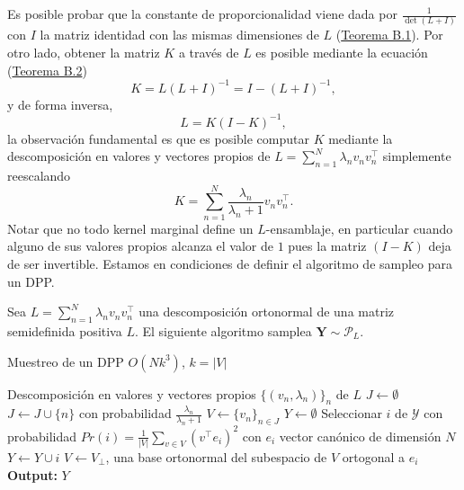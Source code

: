 \vspace{0.2cm}

Es posible probar que la constante de proporcionalidad viene dada por $\frac{1}{\det(L + I)}$ con $I$ la matriz identidad con las mismas dimensiones de $L$ (\hyperlink{Teorema B.1}{Teorema B.1}). Por otro lado, obtener la matriz $K$ a través de $L$ es posible mediante la ecuación (\hyperlink{Teorema B.2}{Teorema B.2})
\[
K = L(L+I)^{-1} = I - (L+I)^{-1} , 
\]
y de forma inversa, 
\[
L = K(I-K)^{-1} , 
\]
la observación fundamental es que es posible computar $K$ mediante la descomposición en valores y vectores propios de $L = \sum_{n=1}^{N} \lambda_nv_n v^{\top}_n$ simplemente reescalando 
\[
K = \sum_{n=1}^{N}\frac{\lambda_n}{\lambda_n + 1}v_n v^{\top}_n .
\]
Notar que no todo kernel marginal define un $L$-ensamblaje, en particular cuando alguno de sus valores propios alcanza el valor de $1$ pues la matriz $(I-K)$ deja de ser invertible. Estamos en condiciones de definir el algoritmo de sampleo para un DPP.

\begin{teo}
Sea $L = \sum_{n=1}^N \lambda_n v_n v_{n}^{\top}$ una descomposición ortonormal de una matriz semidefinida positiva $L$. El siguiente algoritmo samplea $\mathbf{Y} \sim \mathcal{P}_L$.

\begin{algorithm}
\caption{Muestreo de un DPP $O(Nk^3)$, $k = |V|$}\label{alg:alg1}
\begin{algorithmic}
\Require Descomposición en valores y vectores propios 
$\{(v_n , \lambda_n)\}_{n}$ de $L$
\State $J \gets \emptyset$
\State $J \gets J \cup \{n\}$ con probabilidad $\frac{\lambda_n}{\lambda_n+1}$
\EndFor
\State $V \gets \{ v_n \}_{n \in J}$
\State $Y \gets \emptyset$
\State Seleccionar $i$ de $\mathcal{Y}$ con probabilidad $Pr(i) = \frac{1}{|V|}\sum_{v \in V}(v^{\top}e_i)^2$ con $e_i$ vector canónico de dimensión $N$                                                                               
\State $Y \gets Y \cup i$
\State $V \gets V_{\perp}$, una base ortonormal del subespacio de $V$ ortogonal a $e_i$ 
\EndWhile   
\State \textbf{Output: } $Y$
\end{algorithmic}
\end{algorithm}
\end{teo}

